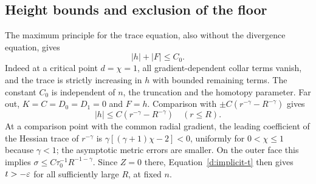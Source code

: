 \subsection{Height bounds and exclusion of the floor}\label{d:floor-estimates}

The maximum principle for the trace equation, also without the
divergence equation, gives
\begin{equation}\label{d:height-bound}
 |h|+|F|\le C_0.
\end{equation}
Indeed at a critical point $d=\chi=1$, all gradient-dependent collar
terms vanish, and the trace is strictly increasing in $h$ with
bounded remaining terms.  The constant $C_0$ is independent of $n$,
the truncation and the homotopy parameter.  Far out,
$K=C=D_0=D_1=0$ and $F=h$.  Comparison with
$\pm C(r^{-\gamma}-R^{-\gamma})$ gives
\begin{equation}\label{d:radial-height}
 |h|\le C(r^{-\gamma}-R^{-\gamma})\quad(r\le R).
\end{equation}
At a comparison point with the common radial gradient, the leading
coefficient of the Hessian trace of $r^{-\gamma}$ is
$\gamma[(\gamma+1)\chi-2]<0$, uniformly for $0<\chi\le1$ because
$\gamma<1$; the asymptotic metric errors are smaller.  On the outer
face this implies
$\sigma\le C\tau_0^{-1}R^{-1-\gamma}$.  Since $Z=0$ there,
Equation~\eqref{d:implicit-t} then gives $t>-\varepsilon$ for all sufficiently
large $R$, at fixed $n$.

